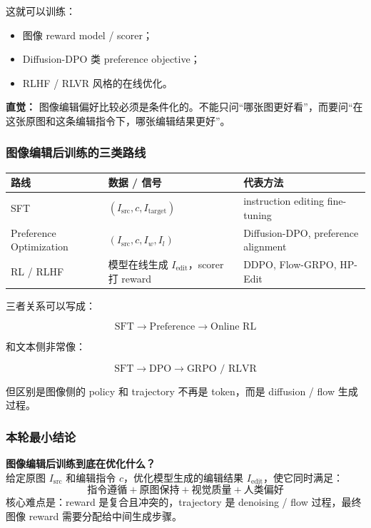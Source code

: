这就可以训练：

\begin{itemize}[leftmargin=1.5em]
  \item 图像 reward model / scorer；
  \item Diffusion-DPO 类 preference objective；
  \item RLHF / RLVR 风格的在线优化。
\end{itemize}

\begin{intubox}
\textbf{直觉：} 图像编辑偏好比较必须是条件化的。不能只问“哪张图更好看”，而要问“在这张原图和这条编辑指令下，哪张编辑结果更好”。
\end{intubox}

\subsubsection{图像编辑后训练的三类路线}

\begin{center}
{\small
\begin{tabular}{p{3cm}p{4.8cm}p{4.8cm}}
\hline
\textbf{路线} & \textbf{数据 / 信号} & \textbf{代表方法} \\
\hline
SFT
&
$(I_\text{src}, c, I_\text{target})$
&
instruction editing fine-tuning
\\
Preference Optimization
&
$(I_\text{src}, c, I_w, I_l)$
&
Diffusion-DPO, preference alignment
\\
RL / RLHF
&
模型在线生成 $I_\text{edit}$，scorer 打 reward
&
DDPO, Flow-GRPO, HP-Edit
\\
\hline
\end{tabular}
}
\end{center}

三者关系可以写成：

\[
\text{SFT}
\to
\text{Preference}
\to
\text{Online RL}
\]

和文本侧非常像：

\[
\text{SFT}
\to
\text{DPO}
\to
\text{GRPO / RLVR}
\]

但区别是图像侧的 policy 和 trajectory 不再是 token，而是 diffusion / flow 生成过程。

\subsubsection{本轮最小结论}

\begin{summarybox}
\textbf{图像编辑后训练到底在优化什么？}\\
给定原图 $I_\text{src}$ 和编辑指令 $c$，优化模型生成的编辑结果 $I_\text{edit}$，使它同时满足：
\[
\text{指令遵循}
+
\text{原图保持}
+
\text{视觉质量}
+
\text{人类偏好}
\]
核心难点是：reward 是复合且冲突的，trajectory 是 denoising / flow 过程，最终图像 reward 需要分配给中间生成步骤。
\end{summarybox}

